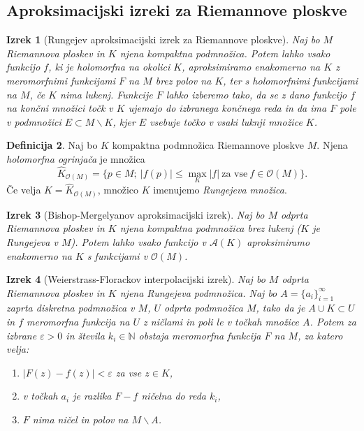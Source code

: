 \documentclass[12pt,a4paper,twoside]{article}
\theoremstyle{definition} %
\newtheorem{definicija}{Definicija}[section]
\theoremstyle{plain} %
\newtheorem{izrek}[definicija]{Izrek}
\numberwithin{equation}{section}  %
\newcommand{\N}{\mathbb N}
\begin{document}
\subsection{Aproksimacijski izreki za Riemannove ploskve}
%
\begin{izrek} [Rungejev aproksimacijski izrek za Riemannove ploskve]
Naj bo $M$ Riemannova ploskev in $K$ njena kompaktna podmnožica. 
Potem lahko vsako funkcijo $f$, ki je holomorfna na okolici $K$, aproksimiramo enakomerno na $K$ z meromorfnimi funkcijami $F$ na $M$ brez polov na $K$, ter s holomorfnimi funkcijami na $M$, če $K$ nima lukenj.
Funkcije $F$ lahko izberemo tako, da se z dano funkcijo $f$ na končni množici točk v $K$ ujemajo do izbranega končnega reda in da ima $F$ pole v podmnožici $E \subset M \backslash K$, kjer $E$ vsebuje točko v vsaki luknji množice $K$. 
\end{izrek}

\begin{definicija}
Naj bo $K$ kompaktna podmnožica Riemannove ploskve $M$. Njena \emph{holomorfna ogrinjača} je množica 
\begin{equation}
\widehat{K}_{\mathcal{O}(M)} = \{p \in M ; \ |f(p)| \leq \max_{K} |f| \ \text{za vse} \ f \in \mathcal{O}(M) \}.
\end{equation}
Če velja $K = \widehat{K}_{\mathcal{O}(M)}$, množico $K$ imenujemo \emph{Rungejeva množica}.
\end{definicija}

\begin{izrek} [Bishop-Mergelyanov aproksimacijski izrek] \label{izr:Bishop-Mergelyan}
Naj bo $M$ odprta Riemannova ploskev in $K$ njena kompaktna podmnožica brez lukenj ($K$ je Rungejeva v $M$). Potem lahko vsako funkcijo v $\mathcal{A}(K)$ aproksimiramo enakomerno na $K$ s funkcijami v $\mathcal{O}(M)$.
\end{izrek}

\begin{izrek} [Weierstrass-Florackov interpolacijski izrek]
Naj bo $M$ odprta Riemannova ploskev in $K$ njena Rungejeva podmnožica. Naj bo $A = \{ a_i \}_{i=1}^{\infty}$ zaprta diskretna podmnožica v $M$, $U$ odprta podmnožica $M$, tako da je $A \cup K \subset U$ in $f$ meromorfna funkcija na $U$ z ničlami in poli le v točkah množice $A$.
Potem za izbrane $\varepsilon > 0$ in števila $k_{i} \in \N$ obstaja meromorfna funkcija $F$ na $M$, za katero velja:
\begin{enumerate}
\item $|F(z) - f(z)| < \varepsilon$ za vse $z \in K$,
\item v točkah $a_i$ je razlika $F-f$ ničelna do reda $k_i$,
\item $F$ nima ničel in polov na $M \backslash A$.
\end{enumerate} 
\end{izrek}
\end{document}
